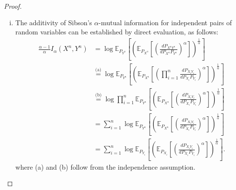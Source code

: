 \documentclass{article}
\numberwithin{theorem}{section}
\numberwithin{example}{section}
\numberwithin{remark}{section}
\numberwithin{definition}{section}
\newcommand{\E}{\mathbb{E}}
\begin{document}
\begin{proof}
\begin{enumerate}[i)]
        \item The additivity of Sibson's $\alpha$-mutual information for independent pairs of random variables can be established by direct evaluation, as follows:
    \begin{align}
        \frac{\alpha-1}{\alpha }I_\alpha (X^n,Y^n) & =  \log \E_{P_{Y^n}} \left[\left(\E_{P_{X^n} }\left[\left(\frac{dP_{X^nY^n}}{dP_{X^n}P_{Y^n}}\right)^\alpha\right]\right)^\frac{1}{\alpha}\right] \\
        & \stackrel {\text{(a)}} = \log   \E_{P_{Y^n}} \left[\left(\E_{P_{X^n} }\left[\left( \prod_{i=1}^n \frac{dP_{X_iY_i}}{dP_{X_i}P_{Y_i}}\right)^\alpha\right]\right)^\frac{1}{\alpha}\right] \\
        & \stackrel {\text{(b)}} = \log   \prod_{i=1}^n \E_{P_{Y^n}} \left[   \left(\E_{P_{X^n} }\left[\left( \frac{dP_{X_iY_i}}{dP_{X_i}P_{Y_i}}\right)^\alpha\right]\right)^\frac{1}{\alpha}\right] \\
        & = \sum_{i=1}^n \log   \E_{P_{Y^n}} \left[  \left(\E_{P_{X^n}} \left[\left( \frac{dP_{X_iY_i}}{dP_{X_i}P_{Y_i}}\right)^\alpha\right]\right)^\frac{1}{\alpha}\right] \\
        & = \sum_{i=1}^n \log \E_{P_{Y_i}} \left[  \left(\E_{P_{X_i} }\left[\left( \frac{dP_{X_iY_i}}{dP_{X_i}P_{Y_i}}\right)^\alpha\right]\right)^\frac{1}{\alpha}\right].
    \end{align}
    where (a) and (b) follow from the independence assumption.        
\end{enumerate}






    
\end{proof}
\end{document}

